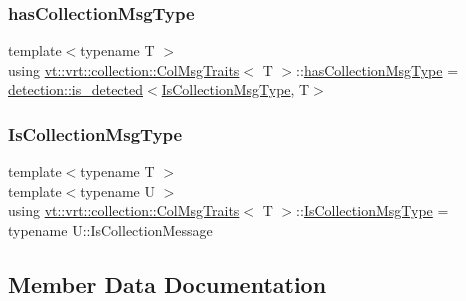 \subsubsection{\texorpdfstring{has\+Collection\+Msg\+Type}{hasCollectionMsgType}}
{\footnotesize\ttfamily template$<$typename T $>$ \\
using \hyperlink{structvt_1_1vrt_1_1collection_1_1_col_msg_traits}{vt\+::vrt\+::collection\+::\+Col\+Msg\+Traits}$<$ T $>$\+::\hyperlink{structvt_1_1vrt_1_1collection_1_1_col_msg_traits_aa181d98e798e8846ceb8f1c8b8204a7e}{has\+Collection\+Msg\+Type} =  \hyperlink{namespacedetection_a30893549a3de1e9603d78dad6d5dce92}{detection\+::is\+\_\+detected}$<$\hyperlink{structvt_1_1vrt_1_1collection_1_1_col_msg_traits_ace04bfcf053b51736d5aec0d28b5274b}{Is\+Collection\+Msg\+Type}, T$>$}

\mbox{\label{structvt_1_1vrt_1_1collection_1_1_col_msg_traits_ace04bfcf053b51736d5aec0d28b5274b}} 
\subsubsection{\texorpdfstring{Is\+Collection\+Msg\+Type}{IsCollectionMsgType}}
{\footnotesize\ttfamily template$<$typename T $>$ \\
template$<$typename U $>$ \\
using \hyperlink{structvt_1_1vrt_1_1collection_1_1_col_msg_traits}{vt\+::vrt\+::collection\+::\+Col\+Msg\+Traits}$<$ T $>$\+::\hyperlink{structvt_1_1vrt_1_1collection_1_1_col_msg_traits_ace04bfcf053b51736d5aec0d28b5274b}{Is\+Collection\+Msg\+Type} =  typename U\+::\+Is\+Collection\+Message}



\subsection{Member Data Documentation}
\mbox{\label{structvt_1_1vrt_1_1collection_1_1_col_msg_traits_a8eb18b4bd6ca875aa981c1998a69896d}} 

